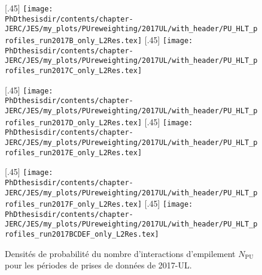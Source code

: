 \begin{figure}[p]
\centering
{}[.45\textwidth]
{\texttt{[image: \\PhDthesisdir/contents/chapter-JERC/JES/my\_plots/PUreweighting/2017UL/with\_header/PU\_HLT\_profiles\_run2017B\_only\_L2Res.tex]}}
\hfill
{}[.45\textwidth]
{\texttt{[image: \\PhDthesisdir/contents/chapter-JERC/JES/my\_plots/PUreweighting/2017UL/with\_header/PU\_HLT\_profiles\_run2017C\_only\_L2Res.tex]}}

\vfill

[.45\textwidth]
{\texttt{[image: \\PhDthesisdir/contents/chapter-JERC/JES/my\_plots/PUreweighting/2017UL/with\_header/PU\_HLT\_profiles\_run2017D\_only\_L2Res.tex]}}
\hfill
{}[.45\textwidth]
{\texttt{[image: \\PhDthesisdir/contents/chapter-JERC/JES/my\_plots/PUreweighting/2017UL/with\_header/PU\_HLT\_profiles\_run2017E\_only\_L2Res.tex]}}

\vfill

[.45\textwidth]
{\texttt{[image: \\PhDthesisdir/contents/chapter-JERC/JES/my\_plots/PUreweighting/2017UL/with\_header/PU\_HLT\_profiles\_run2017F\_only\_L2Res.tex]}}
\hfill
{}[.45\textwidth]
{\texttt{[image: \\PhDthesisdir/contents/chapter-JERC/JES/my\_plots/PUreweighting/2017UL/with\_header/PU\_HLT\_profiles\_run2017BCDEF\_only\_L2Res.tex]}}

\caption[Densités de probabilité de $N_\text{PU}$ pour 2017-UL.]{Densités de probabilité du nombre d'interactions d'empilement $N_\text{PU}$ pour les périodes de prises de données de 2017-UL.}
\label{fig-PU_profile_17UL}
\end{figure}
